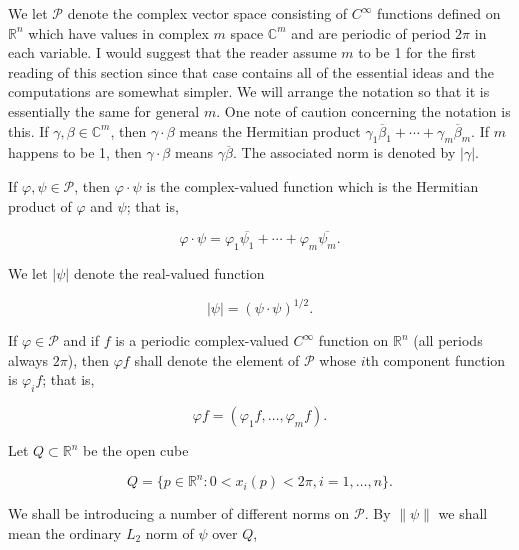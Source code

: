 We let $\mathcal{P}$ denote the complex vector space consisting of $C^\infty$ functions defined on $\mathbb{R}^n$ which have values in complex $m$ space $\mathbb{C}^m$ and are periodic of period $2\pi$ in each variable. I would suggest that the reader assume $m$ to be 1 for the first reading of this section since that case contains all of the essential ideas and the computations are somewhat simpler. We will arrange the notation so that it is essentially the same for general $m$. One note of caution concerning the notation is this. If $\gamma, \beta \in \mathbb{C}^m$, then $\gamma \cdot \beta$ means the Hermitian product $\gamma_1 \overline{\beta}_1 + \cdots + \gamma_m \overline{\beta}_m$. If $m$ happens to be 1, then $\gamma \cdot \beta$ means $\gamma\overline\beta$. The associated norm is denoted by $|\gamma|$.

If $\varphi, \psi \in \mathcal{P}$, then $\varphi \cdot \psi$ is the complex-valued function which is the Hermitian product of $\varphi$ and $\psi$; that is,

\begin{equation}
\tag{6}\label{eq:6.15:6}
\varphi\cdot\psi=\varphi_{1}\overline{{\psi_{1}}}+\cdots+\varphi_{m}\overline{{\psi_{m}}}.
\end{equation}

We let  $ |\psi| $ denote the real-valued function

\begin{equation}
\tag{7}\label{eq:6.15:7}
|\psi|=(\psi\cdot\psi)^{1/2}.
\end{equation}

If $\varphi \in \mathcal{P}$ and if $f$ is a periodic complex-valued $C^\infty$ function on $\mathbb{R}^{n}$ (all periods always $2\pi$), then $\varphi f$ shall denote the element of $\mathcal{P}$ whose $i$th component function is $\varphi_i f$; that is,

\begin{equation}
\tag{8}\label{eq:6.15:8}
\varphi f=(\varphi_{1}f,\ldots,\varphi_{m}f).
\end{equation}

Let  $ Q \subset \mathbb{R}^n $ be the open cube

\begin{equation}
\tag{9}\label{eq:6.15:9}
Q=\{p\in\mathbb{R}^{n}\colon0<x_{i}(p)<2\pi,i=1,\ldots,n\}.
\end{equation}

We shall be introducing a number of different norms on $\mathcal{P}$. By $\|\psi\|$ we shall mean the ordinary $L_{2}$ norm of $\psi$ over $Q$,

